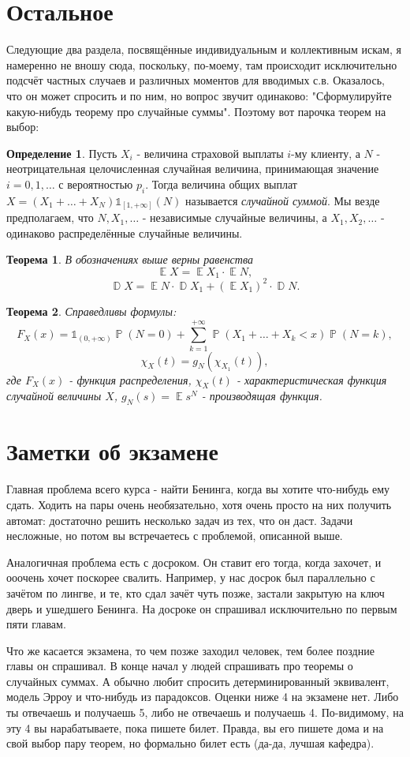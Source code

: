 \documentclass{article}
\newtheorem{theorem}{Теорема}
\theoremstyle{definition}
\newtheorem{definition}{Определение}
\DeclareMathOperator{\ME}{\mathbb{E}}
\DeclareMathOperator{\D}{\mathbb{D}}
\DeclareMathOperator{\prob}{\mathbb{P}}
\begin{document}
\section{Остальное}
Следующие два раздела, посвящённые индивидуальным и коллективным искам, я намеренно не вношу сюда, поскольку, по-моему, там происходит исключительно подсчёт частных случаев и различных моментов для вводимых с.в. Оказалось, что он может спросить и по ним, но вопрос звучит одинаково: "Сформулируйте какую-нибудь теорему про случайные суммы". Поэтому вот парочка теорем на выбор:
\begin{definition}
Пусть $X_i$ - величина страховой выплаты $i$-му клиенту, а $N$ - неотрицательная целочисленная случайная величина, принимающая значение $i = 0, 1, \ldots$ с вероятностью $p_i$. Тогда величина общих выплат $X = (X_1 + \ldots + X_N)\mathbb{1}_{[1, +\infty]}(N)$ называется \textit{случайной суммой}. Мы везде предполагаем, что $N, X_1, \ldots$ - независимые случайные величины, а $X_1, X_2, \ldots$ - одинаково распределённые случайные величины.
\end{definition}
\begin{theorem}
В обозначениях выше верны равенства $$\ME X = \ME X_1 \cdot \ME N,$$ $$\D X = \ME N \cdot \D X_1 + (\ME X_1)^2 \cdot \D N.$$
\end{theorem}
\begin{theorem}
Справедливы формулы: $$F_X(x) = \mathbb{1}_{(0, +\infty)}\prob(N = 0) + \sum\limits_{k = 1}^{+\infty}\prob(X_1 + \ldots + X_k < x)\prob(N = k),$$ $$\chi_X(t) = g_N(\chi_{X_1}(t)),$$ где $F_X(x)$ - функция распределения, $\chi_X(t)$ - характеристическая функция случайной величины $X$, $g_N(s) = \ME s^N$ - производящая функция.
\end{theorem}
\newpage
\section{Заметки об экзамене}
Главная проблема всего курса - найти Бенинга, когда вы хотите что-нибудь ему сдать. Ходить на пары очень необязательно, хотя очень просто на них получить автомат: достаточно решить несколько задач из тех, что он даст. Задачи несложные, но потом вы встречаетесь с проблемой, описанной выше. 

Аналогичная проблема есть с досроком. Он ставит его тогда, когда захочет, и ооочень хочет поскорее свалить. Например, у нас досрок был параллельно с зачётом по лингве, и те, кто сдал зачёт чуть позже, застали закрытую на ключ дверь и ушедшего Бенинга. На досроке он спрашивал исключительно по первым пяти главам.

Что же касается экзамена, то чем позже заходил человек, тем более поздние главы он спрашивал. В конце начал у людей спрашивать про теоремы о случайных суммах. А обычно любит спросить детерминированный эквивалент, модель Эрроу и что-нибудь из парадоксов. Оценки ниже 4 на экзамене нет. Либо ты отвечаешь и получаешь 5, либо не отвечаешь и получаешь 4. По-видимому, на эту 4 вы нарабатываете, пока пишете билет. Правда, вы его пишете дома и на свой выбор пару теорем, но формально билет есть (да-да, лучшая кафедра).
\end{document}
